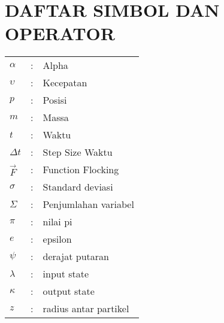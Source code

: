 \chapter*{DAFTAR SIMBOL DAN OPERATOR}
\begin{table}
\begin{tabular}{l l l}
$\alpha$	 &:&	Alpha\\
$\upsilon$	 &:&	Kecepatan\\
$p$	 		 &:&	Posisi\\
$m$		     &:&	Massa\\
$t$		 	 &:&	Waktu\\
$\Delta t$	 &:&	Step Size Waktu\\
$\vec{F}$	 &:&	Function Flocking \\
$\sigma$	 &:&	Standard deviasi\\
$\Sigma$	 &:&	Penjumlahan variabel \\
$\pi$		 &:&	nilai pi\\
$e$			 &:&	epsilon\\
$\psi$		 &:&	derajat putaran\\
$\lambda$	 &:&	input state\\
$\kappa$	 &:&	output state\\
$z$			 &:&	radius antar partikel\\




\end{tabular}
\end{table}
